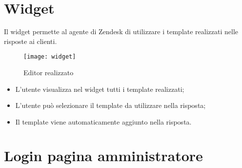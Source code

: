 \section{Widget} 
Il widget permette al agente di Zendesk di utilizzare i template realizzati nelle risposte ai clienti. 
  \begin{figure}[!h] 
  	\centering 
  	\texttt{[image: widget]} 
  	\caption{Editor realizzato }
  \end{figure}
  \begin{itemize}
  	\item L'utente visualizza nel widget tutti i template realizzati;
  	\item L'utente può selezionare il template da utilizzare nella risposta;
  	\item Il template viene automaticamente aggiunto nella risposta. 
  \end{itemize}
\section{Login pagina amministratore}